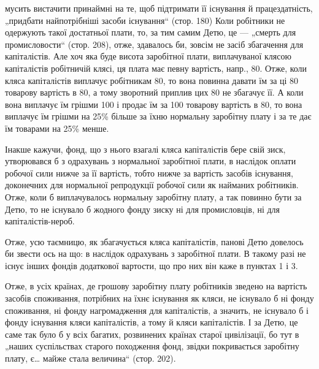 \parcont{}  %
мусить вистачити принаймні на те, щоб підтримати її існування й
працездатність, „придбати найпотрібніші засоби існування“ (стор. 180)
Коли робітники не одержують такої достатньої плати, то, за тим самим
Детю, це — „смерть для промисловости“ (стор. 208), отже, здавалось би,
зовсім не засіб збагачення для капіталістів. Але хоч яка буде висота заробітної
плати, виплачуваної клясою капіталістів робітничій клясі, ця плата
має певну вартість, напр., 80. Отже, коли кляса капіталістів
виплачує робітникам 80, то вона повинна давати їм за ці 80 товарову вартість в 80, а тому зворотний приплив цих
80 не збагачує її. А коли вона виплачує їм грішми 100
і продає їм за 100 товарову вартість в 80, то вона
виплачує їм грішми на 25\% більше за їхню нормальну заробітну плату
і за те дає їм товарами на 25\% менше.

Інакше кажучи, фонд, що з нього взагалі кляса капіталістів бере свій
зиск, утворювався б з одрахувань з нормальної заробітної плати, в наслідок
оплати робочої сили нижче за її вартість, тобто нижче за вартість засобів
існування, доконечних для нормальної репродукції робочої сили як
найманих робітників. Отже, коли б виплачувалось нормальну заробітну
плату, а так повинно бути за Детю, то не існувало б жодного фонду
зиску ні для промисловців, ні для капіталістів-нероб.

Отже, усю таємницю, як збагачується кляса капіталістів, панові Детю
довелось би звести ось на що: в наслідок одрахувань з заробітної плати.
В такому разі не існує інших фондів додаткової вартости, що про них
він каже в пунктах 1 і 3.

Отже, в усіх країнах, де грошову заробітну плату робітників зведено
на вартість засобів споживання, потрібних на їхнє існування як кляси,
не існувало б ні фонду споживання, ні фонду нагромадження для капіталістів,
а значить, не існувало б і фонду існування кляси капіталістів, а
тому й кляси капіталістів. І за Детю, це саме так було б у всіх багатих,
розвинених країнах старої цивілізації, бо тут в „наших суспільствах
старого походження фонд, звідки покривається заробітну плату,
є\dots{} майже стала величина“ (стор. 202).

